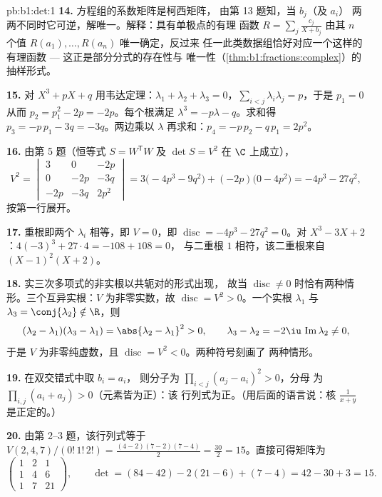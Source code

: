 \begin{solution}{pb:b1:det:1}
\textbf{14.} 方程组的系数矩阵是柯西矩阵，
由第 13 题知，当 $b_j$（及 $a_i$）
两两不同时它可逆，解唯一。解释：具有单极点的有理
函数 $R = \sum_j \frac{c_j}{X + b_j}$ 由其
$n$ 个值 $R(a_1), \dots, R(a_n)$ 唯一确定，反过来
任一此类数据组恰好对应一个这样的有理函数 ---
这正是部分分式的存在性与
唯一性（\cref{thm:b1:fractions:complex}）的抽样形式。

\textbf{15.} 对 $X^3 + pX + q$ 用韦达定理：$\lambda_1 + \lambda_2 +
\lambda_3 = 0$，$\sum_{i<j}\lambda_i\lambda_j = p$，于是 $p_1 = 0$
从而 $p_2 = p_1^2 - 2p = -2p$。每个根满足 $\lambda^3 =
-p\lambda - q$。求和得 $p_3 = -p\,p_1 - 3q = -3q$。两边乘以
$\lambda$ 再求和：$p_4 = -p\,p_2 - q\,p_1 = 2p^2$。

\textbf{16.} 由第 5 题（恒等式 $S = W^{\mathsf T}W$
及 $\det S = V^2$ 在 $\C$ 上成立），
\[
V^2 = \begin{vmatrix}
3 & 0 & -2p\\
0 & -2p & -3q\\
-2p & -3q & 2p^2
\end{vmatrix}
= 3\bigl(-4p^3 - 9q^2\bigr) + (-2p)\bigl(0 - 4p^2\bigr)
= -4p^3 - 27q^2 ,
\]
按第一行展开。

\textbf{17.} 重根即两个 $\lambda_i$ 相等，即
$V = 0$，即 $\operatorname{disc} = -4p^3 - 27q^2 = 0$。对
$X^3 - 3X + 2$：$4(-3)^3 + 27\cdot4 = -108 + 108 = 0$，
与二重根 $1$ 相符，该二重根来自 $(X-1)^2(X+2)$。

\textbf{18.} 实三次多项式的非实根以共轭对的形式出现，
故当 $\operatorname{disc} \neq
0$ 时恰有两种情形。三个互异实根：$V$ 为非零实数，故
$\operatorname{disc} = V^2 > 0$。一个实根 $\lambda_1$ 与
$\lambda_3 = \conj{\lambda_2} \notin \R$，则
\[
(\lambda_2 - \lambda_1)(\lambda_3 - \lambda_1) =
\abs{\lambda_2 - \lambda_1}^2 > 0,
\qquad
\lambda_3 - \lambda_2 = -2\iu\,\operatorname{Im}\lambda_2 \neq 0,
\]
于是 $V$ 为非零纯虚数，且
$\operatorname{disc} = V^2 < 0$。两种符号刻画了
两种情形。

\textbf{19.} 在双交错式中取 $b_i = a_i$，
则分子为 $\prod_{i<j}(a_j - a_i)^2 > 0$，分母
为 $\prod_{i,j}(a_i + a_j) > 0$（元素皆为正）：该
行列式为正。（用后面的语言说：核
$\frac1{x+y}$ 是正定的。）

\textbf{20.} 由第 2--3 题，该行列式等于
$V(2,4,7)/(0!\,1!\,2!) = \frac{(4-2)(7-2)(7-4)}{2} =
\frac{30}{2} = 15$。直接可得矩阵为
\[
\begin{pmatrix}
1 & 2 & 1\\
1 & 4 & 6\\
1 & 7 & 21
\end{pmatrix},
\qquad
\det = (84 - 42) - 2(21 - 6) + (7 - 4) = 42 - 30 + 3 = 15 .
\]


\end{solution}
